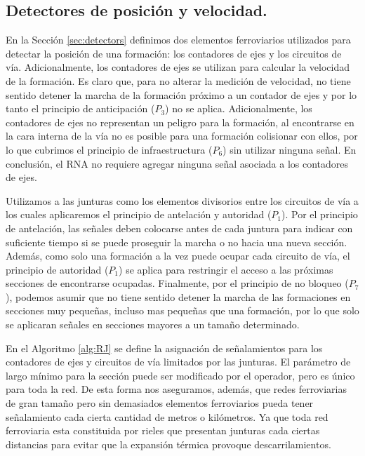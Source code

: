 \subsection{Detectores de posición y velocidad.}

	\label{sec:sig_joint}
	
    
    En la Sección \ref{sec:detectors} definimos dos elementos ferroviarios utilizados para detectar la posición de una formación: los contadores de ejes y los circuitos de vía. Adicionalmente, los contadores de ejes se utilizan para calcular la velocidad de la formación. Es claro que, para no alterar la medición de velocidad, no tiene sentido detener la marcha de la formación próximo a un contador de ejes y por lo tanto el principio de anticipación ($P_3$) no se aplica. Adicionalmente, los contadores de ejes no representan un peligro para la formación, al encontrarse en la cara interna de la vía no es posible para una formación colisionar con ellos, por lo que cubrimos el principio de infraestructura ($P_6$) sin utilizar ninguna señal. En conclusión, el RNA no requiere agregar ninguna señal asociada a los contadores de ejes.

    Utilizamos a las junturas como los elementos divisorios entre los circuitos de vía a los cuales aplicaremos el principio de antelación y autoridad ($P_1$). Por el principio de antelación, las señales deben colocarse antes de cada juntura para indicar con suficiente tiempo si se puede proseguir la marcha o no hacia una nueva sección. Además, como solo una formación a la vez puede ocupar cada circuito de vía, el principio de autoridad ($P_1$) se aplica para restringir el acceso a las próximas secciones de encontrarse ocupadas. Finalmente, por el principio de no bloqueo ($P_7$), podemos asumir que no tiene sentido detener la marcha de las formaciones en secciones muy pequeñas, incluso mas pequeñas que una formación, por lo que solo se aplicaran señales en secciones mayores a un tamaño determinado.
    
    En el Algoritmo \ref{alg:RJ} se define la asignación de señalamientos para los contadores de ejes y circuitos de vía limitados por las junturas. El parámetro de largo mínimo para la sección puede ser modificado por el operador, pero es único para toda la red. De esta forma nos aseguramos, además, que redes ferroviarias de gran tamaño pero sin demasiados elementos ferroviarios pueda tener señalamiento cada cierta cantidad de metros o kilómetros. Ya que toda red ferroviaria esta constituida por rieles que presentan junturas cada ciertas distancias para evitar que la expansión térmica provoque descarrilamientos.


